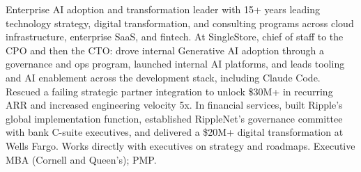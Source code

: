 \documentclass[11pt,letterpaper,sans]{moderncv}
\begin{document}
\makecvtitle


\vspace{6pt}
\small{Enterprise AI adoption and transformation leader with 15+ years leading technology strategy, digital transformation, and consulting programs across cloud infrastructure, enterprise SaaS, and fintech. At SingleStore, chief of staff to the CPO and then the CTO: drove internal Generative AI adoption through a governance and ops program, launched internal AI platforms, and leads tooling and AI enablement across the development stack, including Claude Code. Rescued a failing strategic partner integration to unlock \$30M+ in recurring ARR and increased engineering velocity 5x. In financial services, built Ripple's global implementation function, established RippleNet's governance committee with bank C-suite executives, and delivered a \$20M+ digital transformation at Wells Fargo. Works directly with executives on strategy and roadmaps. Executive MBA (Cornell and Queen's); PMP.}

\end{document}
